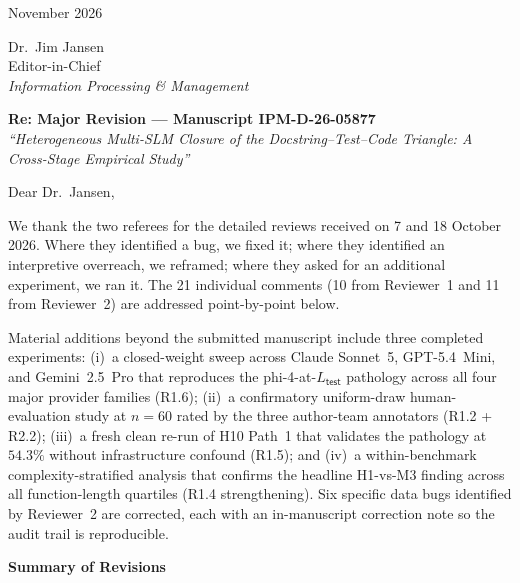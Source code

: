 \documentclass[11pt,a4paper]{article}
\begin{document}
\begin{flushright}
November 2026
\end{flushright}

\vspace{0.3em}

\noindent
Dr.\ Jim Jansen\\
Editor-in-Chief\\
\textit{Information Processing \& Management}

\vspace{0.7em}

\noindent
\textbf{Re: Major Revision --- Manuscript IPM-D-26-05877}\\
\textit{``Heterogeneous Multi-SLM Closure of the Docstring--Test--Code Triangle: A Cross-Stage Empirical Study''}

\vspace{0.7em}

Dear Dr.\ Jansen,

We thank the two referees for the detailed reviews received on 7 and 18 October 2026. Where they identified a bug, we fixed it; where they identified an interpretive overreach, we reframed; where they asked for an additional experiment, we ran it. The 21 individual comments (10 from Reviewer~1 and 11 from Reviewer~2) are addressed point-by-point below.

Material additions beyond the submitted manuscript include three completed experiments: (i)~a closed-weight sweep across Claude Sonnet~5, GPT-5.4~Mini, and Gemini~2.5~Pro that reproduces the phi-4-at-$L_{\textsf{test}}$ pathology across all four major provider families (R1.6); (ii)~a confirmatory uniform-draw human-evaluation study at $n = 60$ rated by the three author-team annotators (R1.2 + R2.2); (iii)~a fresh clean re-run of H10 Path~1 that validates the pathology at $54.3\%$ without infrastructure confound (R1.5); and (iv)~a within-benchmark complexity-stratified analysis that confirms the headline H1-vs-M3 finding across all function-length quartiles (R1.4 strengthening). Six specific data bugs identified by Reviewer~2 are corrected, each with an in-manuscript correction note so the audit trail is reproducible.

\vspace{0.5em}

\noindent\textbf{Summary of Revisions}
\end{document}
